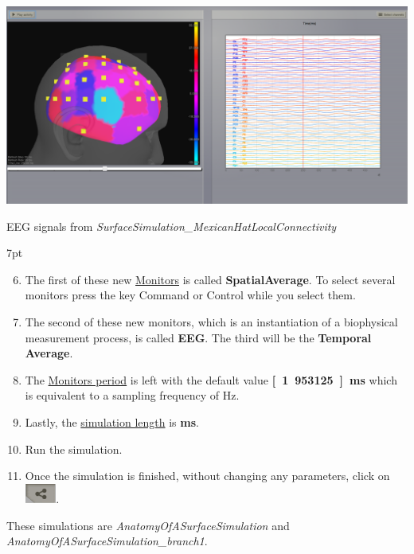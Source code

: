 \documentclass{tufte-handout}
\newenvironment{simulation}{%
  \def\FrameCommand{%
    \hspace{1pt}%
    {\color{ForestGreen}\vrule width 2pt}%
    {\color{simulationshade}\vrule width 4pt}%
    \colorbox{simulationshade}%
  }%
  \MakeFramed{\advance\hsize-\width\FrameRestore}%
  \noindent\hspace{-4.55pt}%
  \begin{adjustwidth}{}{7pt}%
  \vspace{2pt}\vspace{2pt}%
}
{%
  \vspace{2pt}\end{adjustwidth}\endMakeFramed%
}
\begin{document}
\begin{marginfigure}
  \includegraphics[width=\linewidth]{Handout_UI_BuildingYourOwnBrainNetworkModel_MexicanLocalConnectivityPotatoHead.png}%
  \caption{EEG signals from \textit{SurfaceSimulation\_MexicanHatLocalConnectivity}}%
  \label{fig:potato_head}%
\end{marginfigure}

\begin{simulation}
\begin{enumerate}[resume]
\setcounter{enumi}{5}
\item The first of these new \underline{Monitors} is called
\textbf{{SpatialAverage}}. To select several monitors press the key Command or Control while you select them.
\item The second of these new monitors, which is an instantiation of a
biophysical measurement process, is called \textbf{EEG}. The third will be the \textbf{Temporal Average}.
\item The \underline{Monitors period} is left with the default value \textbf{\unit[1.953125]{ms}} which is equivalent to a sampling frequency of \unit[256]{Hz}.
\item Lastly, the \underline{simulation length} is \textbf{\unit[500]{ms}}.
\item Run the simulation.
\item Once the simulation is finished, without changing any parameters, click on \includegraphics[width=0.08\textwidth]{butt_branching}.

\end{enumerate}
\end{simulation}


These simulations are \textit{AnatomyOfASurfaceSimulation} and \textit{AnatomyOfASurfaceSimulation\_branch1}. 
\end{document}
